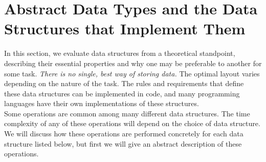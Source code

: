 \chapter{Abstract Data Types and the Data Structures that Implement Them}

In this section, we evaluate data structures from a theoretical standpoint, describing their essential properties and why one may be preferable to another for some task. \textit{There is no single, best way of storing data.} The optimal layout varies depending on the nature of the task. The rules and requirements that define these data structures can be implemented in code, and many programming languages have their own implementations of these structures. \\

Some operations are common among many different data structures. The time complexity of any of these operations will depend on the choice of data structure. We will discuss how these operations are performed concretely for each data structure listed below, but first we will give an abstract description of these operations. \\

